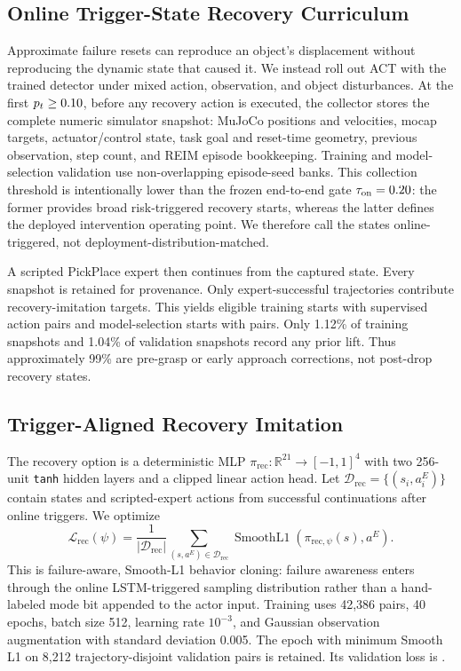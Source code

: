 \documentclass[conference]{IEEEtran}
\newcommand{\policyrec}{\pi_{\mathrm{rec}}}
\begin{document}
\subsection{Online Trigger-State Recovery Curriculum}
\label{sec:trigger-curriculum}

Approximate failure resets can reproduce an object's displacement without
reproducing the dynamic state that caused it. We instead roll out ACT with the
trained detector under mixed action, observation, and object disturbances. At
the first $p_t\geq0.10$, before any recovery action is
executed, the collector stores the complete numeric simulator snapshot:
MuJoCo positions and velocities, mocap targets, actuator/control state, task
goal and reset-time geometry, previous observation, step count, and REIM
episode bookkeeping. Training and model-selection validation use
non-overlapping episode-seed banks. This collection threshold is intentionally
lower than the frozen end-to-end gate
$\tau_{\mathrm{on}}=0.20$: the former provides broad
risk-triggered recovery starts, whereas the latter defines the deployed
intervention operating point. We therefore call the states online-triggered,
not deployment-distribution-matched.

A scripted PickPlace expert then continues from the captured state. Every
snapshot is retained for provenance. Only expert-successful trajectories
contribute recovery-imitation targets. This yields
\RecoveryTrainEligibleStarts{} eligible training starts with
\RecoveryTrainExpertSamples{} supervised action pairs and
\RecoveryValidationEligibleStarts{} model-selection starts with
\RecoveryValidationExpertSamples{} pairs. Only 1.12\% of training snapshots
and 1.04\% of validation snapshots record any prior lift. Thus approximately
99\% are pre-grasp or early approach corrections, not post-drop recovery
states.

\subsection{Trigger-Aligned Recovery Imitation}

The recovery option is a deterministic MLP
$\policyrec:\mathbb{R}^{21}\!\rightarrow[-1,1]^4$ with two 256-unit
\texttt{tanh} hidden layers and a clipped linear action head. Let
$\mathcal{D}_{\mathrm{rec}}=\{(s_i,a_i^E)\}$ contain states and scripted-expert
actions from successful continuations after online triggers. We optimize
\begin{equation}
  \mathcal{L}_{\mathrm{rec}}(\psi)=
  \frac{1}{|\mathcal{D}_{\mathrm{rec}}|}
  \sum_{(s,a^E)\in\mathcal{D}_{\mathrm{rec}}}
  \operatorname{SmoothL1}\!\left(\pi_{\mathrm{rec},\psi}(s),a^E\right).
\end{equation}
This is failure-aware, Smooth-L1 behavior cloning: failure awareness enters
through the online LSTM-triggered sampling distribution rather than a
hand-labeled mode bit appended to the actor input.
Training uses 42,386 pairs, 40 epochs, batch size 512, learning rate
$10^{-3}$, and Gaussian observation augmentation with standard deviation
0.005. The epoch with minimum Smooth L1 on 8,212 trajectory-disjoint validation
pairs is retained. Its validation loss is
\RecoveryWarmStartValidationLoss{}.
\end{document}
